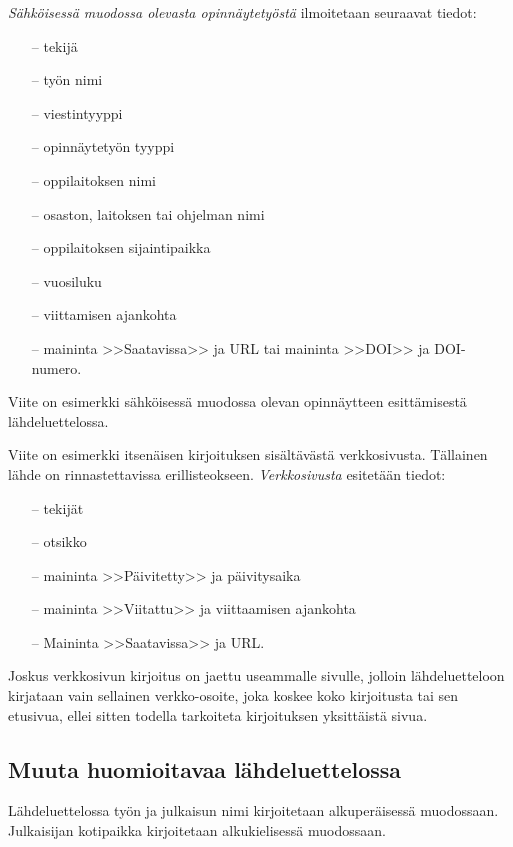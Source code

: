 \documentclass[english,12pt,a4paper,pdftex,elec,utf8]{aaltothesis}
\begin{document}
\textit{S\"ahk\"oisess\"a muodossa olevasta opinn\"aytety\"ost\"a} ilmoitetaan
seuraavat tiedot:

\begin{itemize}
\item[--]tekij\"a
\item[--]ty\"on nimi
\item[--]viestintyyppi
\item[--]opinn\"aytety\"on tyyppi
\item[--]oppilaitoksen nimi
\item[--]osaston, laitoksen tai ohjelman nimi
\item[--]oppilaitoksen sijaintipaikka
\item[--]vuosiluku
\item[--]viittamisen ajankohta
\item[--]maininta >>Saatavissa>> ja URL tai
        maininta >>DOI>> ja DOI-numero.
\end{itemize}

Viite \cite{Adida} on esimerkki s\"ahk\"oisess\"a muodossa olevan
opinn\"aytteen esitt\"amisest\"a l\"ahdeluettelossa.

Viite \cite{viittaaminen} on esimerkki itsen\"aisen kirjoituksen sis\"alt\"av\"ast\"a
verkkosivusta. T\"allainen l\"ahde on rinnastettavissa erillisteokseen.
\textit{Verkkosivusta} esitet\"a\"an tiedot:

\begin{itemize}
\item[--] tekij\"at
\item[--] otsikko
\item[--] maininta >>P\"aivitetty>> ja p\"aivitysaika
\item[--] maininta >>Viitattu>> ja viittaamisen ajankohta
\item[--] Maininta >>Saatavissa>> ja URL.
\end{itemize}

Joskus verkkosivun kirjoitus on jaettu useammalle sivulle, jolloin
l\"ahdeluetteloon kirjataan vain sellainen verkko-osoite, joka koskee
koko kirjoitusta tai sen etusivua, ellei sitten
todella tarkoiteta kirjoituksen yksitt\"aist\"a sivua.

\subsection*{Muuta huomioitavaa l\"ahdeluettelossa}

L\"ahdeluettelossa ty\"on ja julkaisun nimi kirjoitetaan alkuper\"aisess\"a
muodossaan. Julkaisijan kotipaikka kirjoitetaan alkukielisess\"a
muodossaan.
\end{document}
